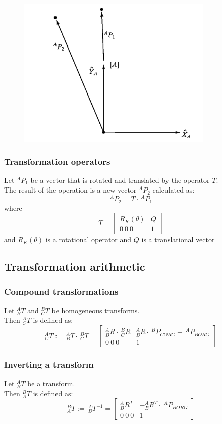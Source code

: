\documentclass[10pt,a4paper]{article}
\begin{document}
\begin{figure}[H]
	\includegraphics[width=0.5\columnwidth]{imgs/rotation_operator}
\end{figure}

\subsubsection{Transformation operators}
Let $^AP_1$ be a vector that is rotated and translated by the operator $T$. \\
The result of the operation is a new vector $^AP_2$ calculated as:
$$
	^AP_2 = T ⋅~^AP_1
$$
where
$$
	T = \left[\begin{array}{c|c}
	R_K(\theta) & Q \\ \hline 0~ 0~ 0 & 1
	\end{array}\right]
$$
and $R_K(\theta)$ is a rotational operator and $Q$ is a translational vector


\subsection{Transformation arithmetic}
\subsubsection{Compound transformations}
Let $^A_BT$ and $^B_CT$ be homogeneous transforms. \\
Then $^A_CT$ is defined as: \\
$$
	^A_CT := ~^A_BT ⋅~ ^B_CT = \left[\begin{array}{c|c}
		^A_BR ⋅~^B_CR & ^A_BR ⋅~^BP_{CORG} + ~^AP_{BORG} \\
		\hline
		0 ~0 ~0 & 1
	\end{array}\right]
$$

\subsubsection{Inverting a transform}
Let $^A_BT$ be a transform. \\
Then $^B_AT$ is defined as: \\
$$
	^B_AT := ~^A_BT^{-1} = \left[\begin{array}{c|c}
	^A_BR^T & -^A_BR^T ⋅~^AP_{BORG} \\
	\hline
	0 ~0 ~0 & 1
	\end{array}\right]
$$
\end{document}
